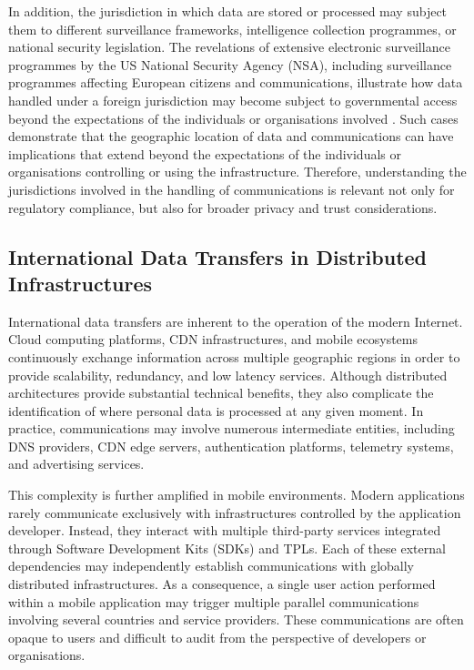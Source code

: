 \documentclass[
A4paper,                %
twoside,                %
openright,              %
chapterprefix=true,     %
12pt,                   %
headings=normal,        %
titlepage=on            %
]{book}
\begin{document}
In addition, the jurisdiction in which data are stored or processed may subject them to different surveillance frameworks, intelligence collection programmes, or national security legislation. The revelations of extensive electronic surveillance programmes by the US National Security Agency (NSA), including surveillance programmes affecting European citizens and communications, illustrate how data handled under a foreign jurisdiction may become subject to governmental access beyond the expectations of the individuals or organisations involved \cite{Texts2014}. Such cases demonstrate that the geographic location of data and communications can have implications that extend beyond the expectations of the individuals or organisations controlling or using the infrastructure. Therefore, understanding the jurisdictions involved in the handling of communications is relevant not only for regulatory compliance, but also for broader privacy and trust considerations.

\subsection{International Data Transfers in Distributed Infrastructures}
\label{sc:background_privacy_international_data_transfers}

International data transfers are inherent to the operation of the modern Internet. Cloud computing platforms, CDN infrastructures, and mobile ecosystems continuously exchange information across multiple geographic regions in order to provide scalability, redundancy, and low latency services. Although distributed architectures provide substantial technical benefits, they also complicate the identification of where personal data is processed at any given moment. In practice, communications may involve numerous intermediate entities, including DNS providers, CDN edge servers, authentication platforms, telemetry systems, and advertising services.

This complexity is further amplified in mobile environments. Modern applications rarely communicate exclusively with infrastructures controlled by the application developer. Instead, they interact with multiple third-party services integrated through Software Development Kits (SDKs) and TPLs. Each of these external dependencies may independently establish communications with globally distributed infrastructures. As a consequence, a single user action performed within a mobile application may trigger multiple parallel communications involving several countries and service providers. These communications are often opaque to users and difficult to audit from the perspective of developers or organisations.
\end{document}
